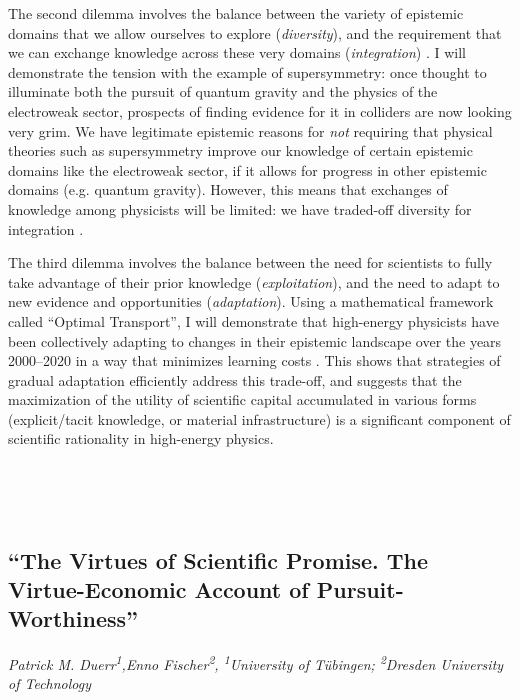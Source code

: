 \documentclass[11pt]{article}
\begin{document}
The second dilemma involves the balance between the variety of epistemic domains that we allow ourselves to explore (\textit{diversity}), and the requirement that we can exchange knowledge across these very domains (\textit{integration}) \cite{Schimmelpfennig2021}. I will demonstrate the tension with the example of supersymmetry: once thought to illuminate both the pursuit of quantum gravity and the physics of the electroweak sector, prospects of finding evidence for it in colliders are now looking very grim. We have legitimate epistemic reasons for \textit{not} requiring that physical theories such as supersymmetry improve our knowledge of certain epistemic domains like the electroweak sector, if it allows for progress in other epistemic domains (e.g. quantum gravity). However, this means that exchanges of knowledge among physicists will be limited: we have traded-off diversity for integration \cite{Gautheron2023}.

The third dilemma involves the balance between the need for scientists to fully take advantage of their prior knowledge (\textit{exploitation}), and the need to adapt to new evidence and opportunities (\textit{adaptation}). Using a mathematical framework called ``Optimal Transport'', I will demonstrate that high-energy physicists have been collectively adapting to changes in their epistemic landscape over the years 2000--2020 in a way that minimizes learning costs \cite{Gautheron2023a}. This shows that strategies of gradual adaptation efficiently address this trade-off, and suggests that the maximization of the utility of scientific capital accumulated in various forms (explicit/tacit knowledge, or material infrastructure) is a significant component of scientific rationality in high-energy physics.

\

\printbibliography[heading=none]

\

\subsection*{\textsf{``The Virtues of Scientific Promise.
The Virtue-Economic Account of
Pursuit-Worthiness''}}

\textcolor{moderncvgreen}{
\textit{Patrick M. Duerr\textsuperscript{1},Enno Fischer\textsuperscript{2},  %
\newline
\textsuperscript{1}University of Tübingen; \textsuperscript{2}Dresden University of Technology
}
}
\end{document}
